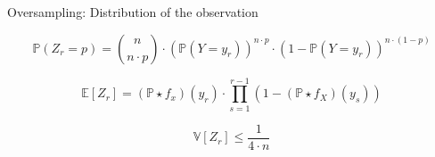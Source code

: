 \begin{frame}{Oversampling: Distribution of the observation}

\[\mathds{P}(Z_{r} = p) = {{n}\choose{n \cdot p}} \cdot \left(\mathds{P}(Y = y_{r})\right)^{n \cdot p} \cdot \left(1 - \mathds{P}(Y = y_{r})\right)^{n \cdot (1 - p)}\]

\[ \mathds{E}\left[Z_{r}\right] = (\mathds{P} \star f_{x})(y_{r}) \cdot \prod\limits_{s = 1}^{r - 1} \left(1 - \left(\mathds{P} \star f_{X}\right)(y_{s})\right)\]

\[ \mathds{V}\left[Z_{r}\right] \leq \frac{1}{4 \cdot n} \]
\end{frame}